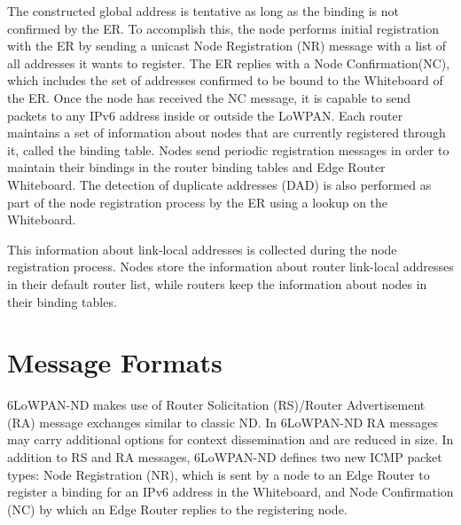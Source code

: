 The constructed global address is tentative as long as the binding is not confirmed by the ER. To accomplish this, the node performs initial registration with the ER by sending a unicast Node Registration (NR) message with a list of all addresses it wants to register. The ER replies with a Node Confirmation(NC), which includes the set of addresses confirmed to be bound to the Whiteboard of the ER. Once the node has received the NC message, it is capable to send packets to any IPv6 address inside or outside the LoWPAN. Each router maintains a set of information about nodes that are currently registered through it, called the binding table. Nodes send periodic registration messages in order to maintain their bindings in the router binding tables and Edge Router Whiteboard. The detection of duplicate addresses (DAD) is also performed as part of the node registration process by the ER using a lookup on the Whiteboard. 

This information about link-local addresses is collected during the node registration process. Nodes store the information about router link-local addresses in their default router list, while routers keep the information about nodes in their binding tables. 



\section{Message Formats}

6LoWPAN-ND makes use of Router Solicitation (RS)/Router Advertisement (RA) message exchanges similar to classic ND. In 6LoWPAN-ND RA messages may carry additional options for context dissemination and are reduced in size. In addition to RS and RA messages, 6LoWPAN-ND defines two new ICMP packet types: Node Registration (NR), which is sent by a node to an Edge Router to register a binding for an IPv6 address in the Whiteboard, and Node Confirmation (NC) by which an Edge Router replies to the registering node. 

